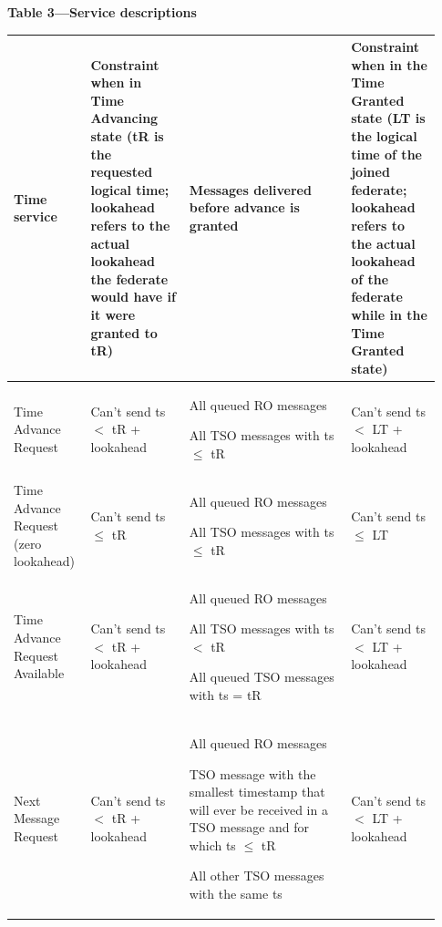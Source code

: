 \begin{compactstdpage}
    \begin{center}
        {\sffamily\bfseries\fontsize{8.1}{9.3}\selectfont Table 3---Service descriptions}\par\vspace{3pt}
    {\fontsize{5.8}{6.7}\selectfont\setlength{\tabcolsep}{1.6pt}\renewcommand{\arraystretch}{1.16}%
        \begin{tabular}{|>{\raggedright\arraybackslash}p{0.15\linewidth}|>{\raggedright\arraybackslash}p{0.22\linewidth}|>{\raggedright\arraybackslash}p{0.36\linewidth}|>{\raggedright\arraybackslash}p{0.20\linewidth}|}
            \hline
            \centering\textbf{Time service}       & \centering\textbf{Constraint when in Time Advancing state (tR is the requested logical time; lookahead refers to the actual lookahead the federate would have if it were granted to tR)} & \centering\textbf{Messages delivered before advance is granted} & \centering\arraybackslash\textbf{Constraint when in the Time Granted state (LT is the logical time of the joined federate; lookahead refers to the actual lookahead of the federate while in the Time Granted state)} \\ \hline
            Time Advance Request                  & Can't send ts $<$ tR + lookahead                                                                                                                                                         & All queued RO messages\par All TSO messages with ts $\leq$ tR & Can't send ts $<$ LT + lookahead \\ \hline
            Time Advance Request (zero lookahead) & Can't send ts $\leq$ tR                                                                                                                                                                  & All queued RO messages\par All TSO messages with ts $\leq$ tR & Can't send ts $\leq$ LT \\ \hline
            Time Advance Request Available        & Can't send ts $<$ tR + lookahead                                                                                                                                                         & All queued RO messages\par All TSO messages with ts $<$ tR\par All queued TSO messages with ts = tR & Can't send ts $<$ LT + lookahead \\ \hline
            Next Message Request                  & Can't send ts $<$ tR + lookahead                                                                                                                                                         & All queued RO messages\par TSO message with the smallest timestamp that will ever be received in a TSO message and for which ts $\leq$ tR\par All other TSO messages with the same ts & Can't send ts $<$ LT + lookahead \\ \hline

\end{tabular}}
\end{center}
\end{compactstdpage}
